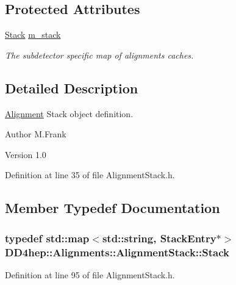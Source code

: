 \subsection*{Protected Attributes}
\begin{DoxyCompactItemize}
\item 
\hyperlink{class_d_d4hep_1_1_alignments_1_1_alignment_stack_a14076338e30231119d5d291b5ac316ee}{Stack} \hyperlink{class_d_d4hep_1_1_alignments_1_1_alignment_stack_ae6d6fe967fc507fc1275e15f5cbff876}{m\_\-stack}
\begin{DoxyCompactList}\small\item\em The subdetector specific map of alignments caches. \item\end{DoxyCompactList}\end{DoxyCompactItemize}


\subsection{Detailed Description}
\hyperlink{class_d_d4hep_1_1_alignments_1_1_alignment}{Alignment} Stack object definition. \begin{DoxyAuthor}{Author}
M.Frank 
\end{DoxyAuthor}
\begin{DoxyVersion}{Version}
1.0 
\end{DoxyVersion}


Definition at line 35 of file AlignmentStack.h.

\subsection{Member Typedef Documentation}
\hypertarget{class_d_d4hep_1_1_alignments_1_1_alignment_stack_a14076338e30231119d5d291b5ac316ee}{
\subsubsection[{Stack}]{\setlength{\rightskip}{0pt plus 5cm}typedef std::map$<$std::string, {\bf StackEntry}$\ast$$>$ {\bf DD4hep::Alignments::AlignmentStack::Stack}}}
\label{class_d_d4hep_1_1_alignments_1_1_alignment_stack_a14076338e30231119d5d291b5ac316ee}


Definition at line 95 of file AlignmentStack.h.

